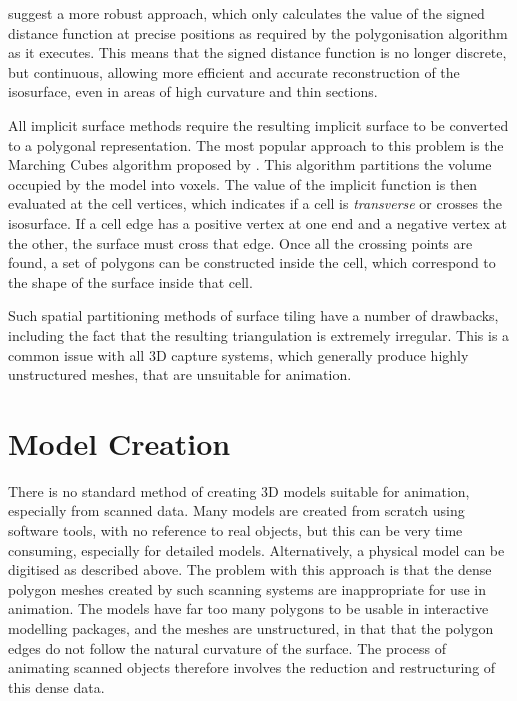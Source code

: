 \citet{Hilton96b} suggest a more robust approach, which only calculates the value of the signed distance function at precise positions as required by the polygonisation algorithm as it executes. This means that the signed distance function is no longer discrete, but continuous, allowing more efficient and accurate reconstruction of the isosurface, even in areas of high curvature and thin sections.

All implicit surface methods require the resulting implicit surface to be converted to a polygonal representation. The most popular approach to this problem is the Marching Cubes algorithm proposed by \citet{Lorensen87}. This algorithm partitions the volume occupied by the model into voxels. The value of the implicit function is then evaluated at the cell vertices, which indicates if a cell is {\it transverse} or crosses the isosurface. If a cell edge has a positive vertex at one end and a negative vertex at the other, the surface must cross that edge. Once all the crossing points are found, a set of polygons can be constructed inside the cell, which correspond to the shape of the surface inside that cell.

Such spatial partitioning methods of surface tiling have a number of drawbacks, including the fact that the resulting triangulation is extremely irregular. This is a common issue with all 3D capture systems, which generally produce highly unstructured meshes, that are unsuitable for animation.

\section{\label{sec:litreview:modeling}Model Creation}

There is no standard method of creating 3D models suitable for animation, especially from scanned data. Many models are created from scratch using software tools, with no reference to real objects, but this can be very time consuming, especially for detailed models. Alternatively, a physical model can be digitised as described above. The problem with this approach is that the dense polygon meshes created by such scanning systems are inappropriate for use in animation. The models have far too many polygons to be usable in interactive modelling packages, and the meshes are unstructured, in that that the polygon edges do not follow the natural curvature of the surface. The process of animating scanned objects therefore involves the reduction and restructuring of this dense data.
 
